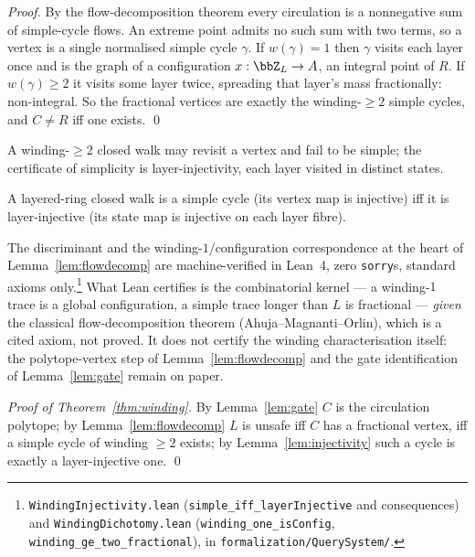 \begin{proof}
By the flow-decomposition theorem every circulation is a nonnegative sum of
simple-cycle flows. An extreme point admits no such sum with two terms, so a vertex
is a single normalised simple cycle $\gamma$. If $w(\gamma)=1$ then $\gamma$ visits
each layer once and is the graph of a configuration $x:\bbZ_L\to A$, an integral
point of $R$. If $w(\gamma)\ge2$ it visits some layer twice, spreading that layer's
mass fractionally: non-integral. So the fractional vertices are exactly the
winding-$\ge2$ simple cycles, and $C\neq R$ iff one exists. \qed
\end{proof}

A winding-$\ge2$ closed walk may revisit a vertex and fail to be simple; the
certificate of simplicity is layer-injectivity, each layer visited in distinct
states.

\begin{lemma}\label{lem:injectivity}
A layered-ring closed walk is a simple cycle (its vertex map is injective) iff it
is layer-injective (its state map is injective on each layer fibre).
\end{lemma}

The discriminant and the winding-$1$/configuration correspondence at the heart of
Lemma~\ref{lem:flowdecomp} are machine-verified in Lean~4, zero \texttt{sorry}s,
standard axioms only.\footnote{\texttt{WindingInjectivity.lean}
(\texttt{simple\_iff\_layerInjective} and consequences) and
\texttt{WindingDichotomy.lean} (\texttt{winding\_one\_isConfig},
\texttt{winding\_ge\_two\_fractional}), in
\texttt{formalization/QuerySystem/}.} What Lean certifies is the combinatorial
kernel --- a winding-$1$ trace is a global configuration, a simple trace longer
than $L$ is fractional --- \emph{given} the classical flow-decomposition theorem
(Ahuja--Magnanti--Orlin), which is a cited axiom, not proved. It does not certify
the winding characterisation itself: the polytope-vertex step of
Lemma~\ref{lem:flowdecomp} and the gate identification of Lemma~\ref{lem:gate}
remain on paper.

\begin{proof}[Proof of Theorem~\ref{thm:winding}]
By Lemma~\ref{lem:gate} $C$ is the circulation polytope; by
Lemma~\ref{lem:flowdecomp} $L$ is unsafe iff $C$ has a fractional vertex, iff a
simple cycle of winding $\ge2$ exists; by Lemma~\ref{lem:injectivity} such a cycle
is exactly a layer-injective one. \qed
\end{proof}


